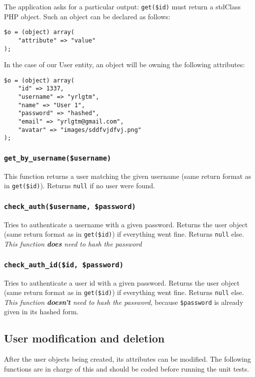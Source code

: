 \documentclass[twoside,a4paper,12pt]{article}
\begin{document}
The application asks for a particular output: \texttt{get(\$id)} must return a stdClass PHP object. Such an object can be declared as follows:

\begin{lstlisting}
$o = (object) array(
	"attribute" => "value"
);
\end{lstlisting}

In the case of our User entity, an object will be owning the following attributes:

\begin{lstlisting}
$o = (object) array(
    "id" => 1337,
    "username" => "yrlgtm",
    "name" => "User 1",
    "password" => "hashed",
    "email" => "yrlgtm@gmail.com",
    "avatar" => "images/sddfvjdfvj.png" 
);
\end{lstlisting}

\subsubsection{\texttt{get\_by\_username(\$username)}}
This function returns a user matching the given username (same return format as in \texttt{get(\$id)}). Returns \texttt{null} if no user were found.

\subsubsection{\texttt{check\_auth(\$username, \$password)}}
Tries to authenticate a username with a given password. Returns the user object (same return format as in \texttt{get(\$id)}) if everything went fine. Returns \texttt{null} else. \textit{This function \textbf{does} need to hash the password}

\subsubsection{\texttt{check\_auth\_id(\$id, \$password)}}
Tries to authenticate a user id with a given password. Returns the user object (same return format as in \texttt{get(\$id)}) if everything went fine. Returns \texttt{null} else. \textit{This function \textbf{doesn't} need to hash the password}, because \texttt{\$password} is already given in its hashed form.

\subsection{User modification and deletion}
After the user objects being created, its attributes can be modified. The following functions are in charge of this and should be coded before running the unit tests.
\end{document}
